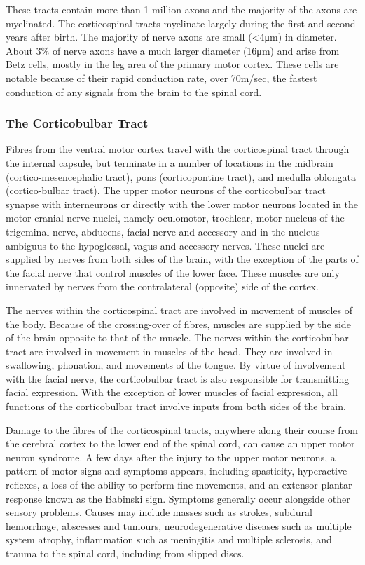 These tracts contain more than 1 million axons and the majority of the axons are myelinated. The corticospinal tracts myelinate largely during the first and second years after birth. The majority of nerve axons are small (\textless4μm) in diameter. About 3\% of nerve axons have a much larger diameter (16μm) and arise from Betz cells, mostly in the leg area of the primary motor cortex. These cells are notable because of their rapid conduction rate, over 70m/sec, the fastest conduction of any signals from the brain to the spinal cord.

\hypertarget{the-corticobulbar-tract}{%
\subsubsection{The Corticobulbar Tract}\label{the-corticobulbar-tract}}

Fibres from the ventral motor cortex travel with the corticospinal tract through the internal capsule, but terminate in a number of locations in the midbrain (cortico-mesencephalic tract), pons (corticopontine tract), and medulla oblongata (cortico-bulbar tract). The upper motor neurons of the corticobulbar tract synapse with interneurons or directly with the lower motor neurons located in the motor cranial nerve nuclei, namely oculomotor, trochlear, motor nucleus of the trigeminal nerve, abducens, facial nerve and accessory and in the nucleus ambiguus to the hypoglossal, vagus and accessory nerves. These nuclei are supplied by nerves from both sides of the brain, with the exception of the parts of the facial nerve that control muscles of the lower face. These muscles are only innervated by nerves from the contralateral (opposite) side of the cortex.

The nerves within the corticospinal tract are involved in movement of muscles of the body. Because of the crossing-over of fibres, muscles are supplied by the side of the brain opposite to that of the muscle. The nerves within the corticobulbar tract are involved in movement in muscles of the head. They are involved in swallowing, phonation, and movements of the tongue. By virtue of involvement with the facial nerve, the corticobulbar tract is also responsible for transmitting facial expression. With the exception of lower muscles of facial expression, all functions of the corticobulbar tract involve inputs from both sides of the brain.

Damage to the fibres of the corticospinal tracts, anywhere along their course from the cerebral cortex to the lower end of the spinal cord, can cause an upper motor neuron syndrome. A few days after the injury to the upper motor neurons, a pattern of motor signs and symptoms appears, including spasticity, hyperactive reflexes, a loss of the ability to perform fine movements, and an extensor plantar response known as the Babinski sign. Symptoms generally occur alongside other sensory problems. Causes may include masses such as strokes, subdural hemorrhage, abscesses and tumours, neurodegenerative diseases such as multiple system atrophy, inflammation such as meningitis and multiple sclerosis, and trauma to the spinal cord, including from slipped discs.

